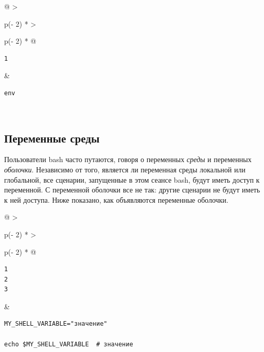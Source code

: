 \documentclass{report}
\begin{document}
\begin{longtable}[]{@{}
  >{\raggedright\arraybackslash}p{(\columnwidth - 2\tabcolsep) * }
  >{\raggedright\arraybackslash}p{(\columnwidth - 2\tabcolsep) * }@{}}
\toprule
\endhead
\begin{minipage}[t]{\linewidth}\raggedright
\begin{verbatim}
1
\end{verbatim}
\end{minipage} & \begin{minipage}[t]{\linewidth}\raggedright
\begin{verbatim}
env
\end{verbatim}
\end{minipage} \\ \addlinespace
\bottomrule
\end{longtable}

\hypertarget{Shell-Variables}{%
\subsection{\texorpdfstring{\protect\hyperlink{Shell-Variables}{}Переменные
среды}{Переменные среды}}\label{Shell-Variables}}

Пользователи bash часто путаются, говоря о переменных \emph{среды} и
переменных \emph{оболочки}. Независимо от того, является ли переменная
среды локальной или глобальной, все сценарии, запущенные в этом сеансе
bash, будут иметь доступ к переменной. С переменной оболочки все не так:
другие сценарии не будут иметь к ней доступа. Ниже показано, как
объявляются переменные оболочки.

\begin{longtable}[]{@{}
  >{\raggedright\arraybackslash}p{(\columnwidth - 2\tabcolsep) * }
  >{\raggedright\arraybackslash}p{(\columnwidth - 2\tabcolsep) * }@{}}
\toprule
\endhead
\begin{minipage}[t]{\linewidth}\raggedright
\begin{verbatim}
1
2
3
\end{verbatim}
\end{minipage} & \begin{minipage}[t]{\linewidth}\raggedright
\begin{verbatim}
MY_SHELL_VARIABLE="значение"

echo $MY_SHELL_VARIABLE  # значение
\end{verbatim}
\end{minipage} \\ \addlinespace
\bottomrule
\end{longtable}
\end{document}
